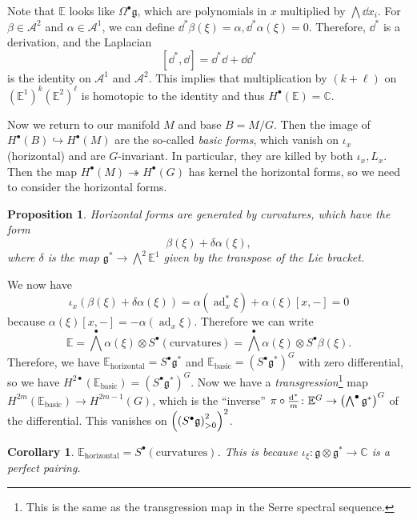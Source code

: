 \documentclass[leqno, openany]{memoir}
\newtheorem{cor}[thm]{Corollary}
\newtheorem{prop}[thm]{Proposition}
\theoremstyle{definition}
\theoremstyle{remark}
\theoremstyle{plain}
\theoremstyle{definition}
\theoremstyle{remark}
\newcommand{\C}{\mathbb{C}}
\newcommand{\E}{\mathbb{E}}
\newcommand{\mc}[1]{\mathcal{#1}}
\newcommand{\mf}[1]{\mathfrak{#1}}
\DeclareMathOperator{\ad}{ad}
\begin{document}
Note that $\E$ looks like $\Omega^{\bullet} \mf{g}$, which are polynomials in
$x$ multiplied by $\bigwedge \dd{x_i}$. For $\beta \in \mc{A}^2$ and $\alpha
\in \mc{A}^1$, we can define $\dd^*{\beta}(\xi) = \alpha, \dd^* \alpha(\xi) =
0$. Therefore, $\dd^*$ is a derivation, and the Laplacian \[ [\dd^*, \dd] =
\dd^* \dd + \dd \dd^* \] is the identity on $\mc{A}^1$ and $\mc{A}^2$. This
implies that multiplication by $(k+\ell)$ on ${(\E^1)}^k {(\E^2)}^{\ell}$ is
homotopic to the identity and thus $H^{\bullet}(\E) = \C$.

Now we return to our manifold $M$ and base $B = M/G$. Then the image of
$H^{\bullet}(B) \hookrightarrow H^{\bullet}(M)$ are the so-called \textit{basic
forms}, which vanish on $\iota_x$ (horizontal) and are $G$-invariant. In
particular, they are killed by both $\iota_x, L_x$. Then the map
$H^{\bullet}(M) \twoheadrightarrow H^{\bullet}(G)$ has kernel the horizontal
forms, so we need to consider the horizontal forms.

\begin{prop} Horizontal forms are generated by \textit{curvatures}, which have
    the form \[ \beta(\xi) + \delta \alpha(\xi), \] where $\delta$ is the map
$\mf{g}^* \to \bigwedge^2 \E^1$ given by the transpose of the Lie bracket.
\end{prop}

We now have \[ \iota_x (\beta(\xi) + \delta \alpha(\xi)) = \alpha(\ad_x^* \xi)
    + \alpha(\xi) [x,-] = 0 \] because $\alpha(\xi)[x,-] = -\alpha(\ad_x \xi)$.
    Therefore we can write \[ \E = {\bigwedge}^{\bullet} \alpha(\xi) \otimes
    S^{\bullet}(\text{curvatures}) = {\bigwedge}^{\bullet} \alpha(\xi) \otimes
S^{\bullet} \beta(\xi). \] Therefore, we have $\E_{\text{horizontal}} =
S^{\bullet} \mf{g}^*$ and $\E_{\text{basic}} = {(S^{\bullet} \mf{g}^*)}^G$ with
zero differential, so we have $H^{2 \bullet}(\E_{\text{basic}}) = {(S^{\bullet}
\mf{g}^*)}^G$. Now we have a \textit{transgression}\footnote{This is the same
as the transgression map in the Serre spectral sequence.} map $H^{2
m}(\E_{\text{basic}}) \to H^{2 m-1}(G)$, which is the ``inverse'' $\pi \circ
\frac{\dd^*}{m} \colon \E^G \to { \qty( \bigwedge^{\bullet} \mf{g}^* ) }^G$ of
the differential. This vanishes on ${ \qty( { ( S^{\bullet} \mf{g} ) }^2_{>0} )
}^2$.

\begin{cor} $\E_{\text{horizontal}} = S^{\bullet}(\text{curvatures})$. This is
because $\iota_{\xi} \colon \mf{g} \otimes \mf{g}^* \to \C$ is a perfect
pairing.  \end{cor}
\end{document}
